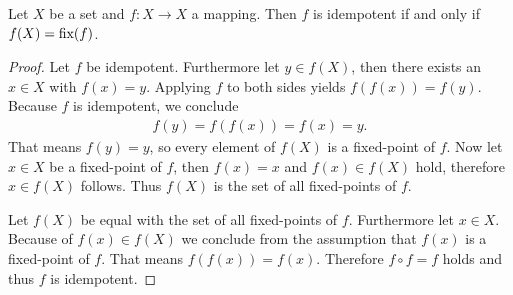 \begin{theorem}\label{theorem:mappings:idempotent_fixed_points}
    Let $X$ be a set and $f\colon X\rightarrow X$ a mapping. Then $f$ is idempotent if and only if $f(X)=\text{fix}(f)$.
\end{theorem}
\begin{proof}
    \proofright Let $f$ be idempotent. Furthermore let $y\in f(X)$, then there exists an $x\in X$ with $f(x)=y$. Applying $f$ to both sides yields $f(f(x))=f(y)$. Because $f$ is idempotent, we conclude \begin{align}f(y)=f(f(x))=f(x)=y.\end{align} That means $f(y)=y$, so every element of $f(X)$ is a fixed-point of $f$. Now let $x\in X$ be a fixed-point of $f$, then $f(x)=x$ and $f(x)\in f(X)$ hold, therefore $x\in f(X)$ follows. Thus $f(X)$ is the set of all fixed-points of $f$.

    \proofleft Let $f(X)$ be equal with the set of all fixed-points of $f$. Furthermore let $x\in X$. Because of $f(x)\in f(X)$ we conclude from the assumption that $f(x)$ is a fixed-point of $f$. That means $f(f(x))=f(x)$. Therefore $f\circ f=f$ holds and thus $f$ is idempotent.
\end{proof}

